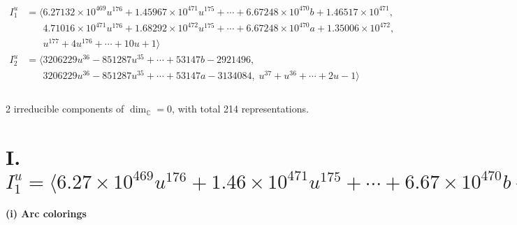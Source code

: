 \documentclass[1p]{elsarticle_modified}
\theoremstyle{definition}
\begin{document}
\begin{align*}
I^u_{1}&=\langle 
6.27132\times10^{469} u^{176}+1.45967\times10^{471} u^{175}+\cdots+6.67248\times10^{470} b+1.46517\times10^{471},\\
\phantom{I^u_{1}}&\phantom{= \langle  }4.71016\times10^{471} u^{176}+1.68292\times10^{472} u^{175}+\cdots+6.67248\times10^{470} a+1.35006\times10^{472},\\
\phantom{I^u_{1}}&\phantom{= \langle  }u^{177}+4 u^{176}+\cdots+10 u+1\rangle \\
I^u_{2}&=\langle 
3206229 u^{36}-851287 u^{35}+\cdots+53147 b-2921496,\\
\phantom{I^u_{2}}&\phantom{= \langle  }3206229 u^{36}-851287 u^{35}+\cdots+53147 a-3134084,\;u^{37}+u^{36}+\cdots+2 u-1\rangle \\
\\
\end{align*}
\raggedright * 2 irreducible components of $\dim_{\mathbb{C}}=0$, with total 214 representations.\\
\newpage
\renewcommand{\arraystretch}{1}
\centering \section*{I. $I^u_{1}= \langle 6.27\times10^{469} u^{176}+1.46\times10^{471} u^{175}+\cdots+6.67\times10^{470} b+1.47\times10^{471},\;4.71\times10^{471} u^{176}+1.68\times10^{472} u^{175}+\cdots+6.67\times10^{470} a+1.35\times10^{472},\;u^{177}+4 u^{176}+\cdots+10 u+1 \rangle$}
\flushleft \textbf{(i) Arc colorings}\\
\end{document}
